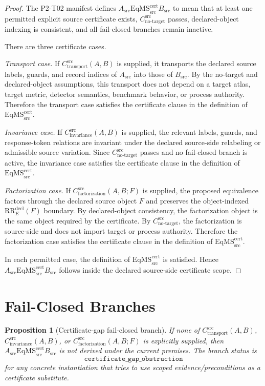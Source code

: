 \documentclass[11pt]{article}
\newcommand{\RREObj}{\mathrm{RR}_{E}^{\mathrm{decl}}}
\newcommand{\CTr}{C_{\mathrm{transport}}^{\mathrm{src}}}
\newcommand{\CInv}{C_{\mathrm{invariance}}^{\mathrm{src}}}
\newcommand{\CFact}{C_{\mathrm{factorization}}^{\mathrm{src}}}
\newcommand{\CNTI}{C_{\mathrm{no\text{-}target}}^{\mathrm{src}}}
\newcommand{\EqMS}{\mathrm{EqMS}_{\mathrm{src}}^{\mathrm{cert}}}
\newtheorem{proposition}{Proposition}
\begin{document}
\begin{proof}
The P2-T02 manifest defines \(A_{\mathrm{src}}\EqMS B_{\mathrm{src}}\) to mean
that at least one permitted explicit source certificate exists, \(\CNTI\)
passes, declared-object indexing is consistent, and all fail-closed branches
remain inactive.

There are three certificate cases.

\emph{Transport case.} If \(\CTr(A,B)\) is supplied, it transports the declared
source labels, guards, and record indices of \(A_{\mathrm{src}}\) into those of
\(B_{\mathrm{src}}\). By the no-target and declared-object assumptions, this
transport does not depend on a target atlas, target metric, detector semantics,
benchmark behavior, or process authority. Therefore the transport case
satisfies the certificate clause in the definition of \(\EqMS\).

\emph{Invariance case.} If \(\CInv(A,B)\) is supplied, the relevant labels,
guards, and response-token relations are invariant under the declared
source-side relabeling or admissible source variation. Since \(\CNTI\) passes
and no fail-closed branch is active, the invariance case satisfies the
certificate clause in the definition of \(\EqMS\).

\emph{Factorization case.} If \(\CFact(A,B;F)\) is supplied, the proposed
equivalence factors through the declared source object \(F\) and preserves the
object-indexed \(\RREObj(F)\) boundary. By declared-object consistency, the
factorization object is the same object required by the certificate. By
\(\CNTI\), the factorization is source-side and does not import target or
process authority. Therefore the factorization case satisfies the certificate
clause in the definition of \(\EqMS\).

In each permitted case, the definition of \(\EqMS\) is satisfied. Hence
\(A_{\mathrm{src}}\EqMS B_{\mathrm{src}}\) follows inside the declared
source-side certificate scope.
\end{proof}

\section{Fail-Closed Branches}

\begin{proposition}[Certificate-gap fail-closed branch]
If none of \(\CTr(A,B)\), \(\CInv(A,B)\), or \(\CFact(A,B;F)\) is explicitly
supplied, then \(A_{\mathrm{src}}\EqMS B_{\mathrm{src}}\) is not derived under
the current premises. The branch status is
\[
  \texttt{certificate\_gap\_obstruction}
\]
for any concrete instantiation that tries to use scoped evidence/preconditions
as a certificate substitute.
\end{proposition}
\end{document}
